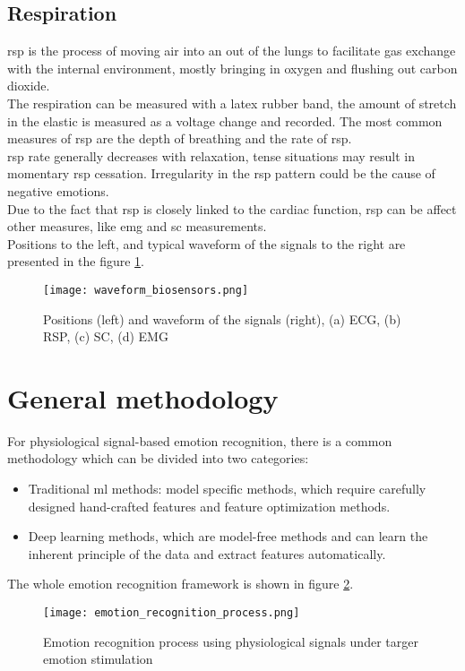 \subsection{Respiration}
\gls{rsp} is the process of moving air into an out of the lungs to facilitate gas exchange with the internal environment, mostly bringing in oxygen and flushing out carbon dioxide.
\\
The respiration can be measured with a latex rubber band, the amount of stretch in the elastic is measured as a voltage change and recorded. The most common measures of \gls{rsp} are the depth of breathing and the rate of \gls{rsp}.
\\ \indent
\gls{rsp} rate generally decreases with relaxation, tense situations may result in momentary \gls{rsp} cessation. Irregularity in the \gls{rsp} pattern could be the cause of negative emotions.
\\
Due to the fact that \gls{rsp} is closely linked to the cardiac function, \gls{rsp} can be affect other measures, like \gls{emg} and \gls{sc} measurements.
\\
Positions to the left, and typical waveform of the signals to the right are presented in the figure \ref{fig:waveform_biosensors}.
\begin{figure}[h]
    \centering
    \texttt{[image: waveform\_biosensors.png]} 
	\caption{Positions (left) and waveform of the signals (right), (a) ECG, (b) RSP, (c) SC, (d) EMG}
    \label{fig:waveform_biosensors}
\end{figure}

\section{General methodology}\label{general_methodology}
For physiological signal-based emotion recognition, there is a common methodology which can be divided into two categories:
\begin{itemize}
	\item Traditional \gls{ml} methods: model specific methods, which require carefully designed hand-crafted features and feature optimization methods.
	\item Deep learning methods, which are model-free methods and can learn the inherent principle of the data and extract features automatically.
\end{itemize}
The whole emotion recognition framework is shown in figure \ref{fig:emotion_recognition_process}.
\begin{figure}[h]
    \centering
    \texttt{[image: emotion\_recognition\_process.png]} 
	\caption{Emotion recognition process using physiological signals under targer emotion stimulation}
    \label{fig:emotion_recognition_process}
\end{figure}

